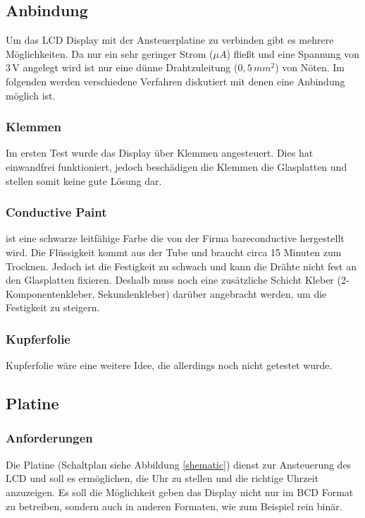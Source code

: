\subsection{Anbindung}
Um das LCD Display mit der Ansteuerplatine zu verbinden gibt es mehrere Möglichkeiten. Da nur ein sehr geringer Strom (\(\mu A\)) fließt und eine Spannung von \(3\,\textrm{V}\) angelegt wird ist nur eine dünne Drahtzuleitung (\(0,5\, mm^2\)) von Nöten. Im folgenden werden verschiedene Verfahren diskutiert mit denen eine Anbindung möglich ist.

\subsubsection{Klemmen}
Im ersten Test wurde das Display über Klemmen angesteuert. Dies hat einwandfrei funktioniert, jedoch beschädigen die Klemmen die Glasplatten und stellen somit keine gute Lösung dar.

\subsubsection{Conductive Paint}
\cite[\textit{Conductive Paint}]{conductivepaint} ist eine schwarze leitfähige Farbe die von der Firma bareconductive hergestellt wird. Die Flüssigkeit kommt aus der Tube und braucht circa 15 Minuten zum Trocknen. Jedoch ist die Festigkeit zu schwach und kann die Drähte nicht fest an den Glasplatten fixieren. Deshalb muss noch eine zusätzliche Schicht Kleber (2-Komponentenkleber, Sekundenkleber) darüber angebracht werden, um die Festigkeit zu steigern.

\subsubsection{Kupferfolie}
Kupferfolie wäre eine weitere Idee, die allerdings noch nicht getestet wurde.

\subsection{Platine}\label{subsec:platine}

\subsubsection{Anforderungen}
Die Platine (Schaltplan siehe Abbildung \ref{shematic}) dienst zur Ansteuerung des LCD und soll es ermöglichen, die Uhr zu stellen und die richtige Uhrzeit anzuzeigen. Es soll die Möglichkeit geben das Display nicht nur im BCD Format zu betreiben, sondern auch in anderen Formaten, wie zum Beispiel rein binär.


